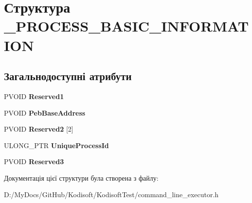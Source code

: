 \hypertarget{struct___p_r_o_c_e_s_s___b_a_s_i_c___i_n_f_o_r_m_a_t_i_o_n}{\section{Структура \+\_\+\+P\+R\+O\+C\+E\+S\+S\+\_\+\+B\+A\+S\+I\+C\+\_\+\+I\+N\+F\+O\+R\+M\+A\+T\+I\+O\+N}
\label{struct___p_r_o_c_e_s_s___b_a_s_i_c___i_n_f_o_r_m_a_t_i_o_n}
}
\subsection*{Загальнодоступні атрибути}
\begin{DoxyCompactItemize}
\item 
\hypertarget{struct___p_r_o_c_e_s_s___b_a_s_i_c___i_n_f_o_r_m_a_t_i_o_n_ac25372bf10c8a8ebac9d189bc0e6ecdc}{P\+V\+O\+I\+D {\bfseries Reserved1}}\label{struct___p_r_o_c_e_s_s___b_a_s_i_c___i_n_f_o_r_m_a_t_i_o_n_ac25372bf10c8a8ebac9d189bc0e6ecdc}

\item 
\hypertarget{struct___p_r_o_c_e_s_s___b_a_s_i_c___i_n_f_o_r_m_a_t_i_o_n_a411f27dee3e5ef61626c15e1b64cc058}{P\+V\+O\+I\+D {\bfseries Peb\+Base\+Address}}\label{struct___p_r_o_c_e_s_s___b_a_s_i_c___i_n_f_o_r_m_a_t_i_o_n_a411f27dee3e5ef61626c15e1b64cc058}

\item 
\hypertarget{struct___p_r_o_c_e_s_s___b_a_s_i_c___i_n_f_o_r_m_a_t_i_o_n_ac89c5f2b3af610c8748dcc3c5790a061}{P\+V\+O\+I\+D {\bfseries Reserved2} \mbox{[}2\mbox{]}}\label{struct___p_r_o_c_e_s_s___b_a_s_i_c___i_n_f_o_r_m_a_t_i_o_n_ac89c5f2b3af610c8748dcc3c5790a061}

\item 
\hypertarget{struct___p_r_o_c_e_s_s___b_a_s_i_c___i_n_f_o_r_m_a_t_i_o_n_afe6e56b5ae0aff9044ee218c86f59f2d}{U\+L\+O\+N\+G\+\_\+\+P\+T\+R {\bfseries Unique\+Process\+Id}}\label{struct___p_r_o_c_e_s_s___b_a_s_i_c___i_n_f_o_r_m_a_t_i_o_n_afe6e56b5ae0aff9044ee218c86f59f2d}

\item 
\hypertarget{struct___p_r_o_c_e_s_s___b_a_s_i_c___i_n_f_o_r_m_a_t_i_o_n_a88b84e8b2c7f6c241ea9e20e8376abaf}{P\+V\+O\+I\+D {\bfseries Reserved3}}\label{struct___p_r_o_c_e_s_s___b_a_s_i_c___i_n_f_o_r_m_a_t_i_o_n_a88b84e8b2c7f6c241ea9e20e8376abaf}

\end{DoxyCompactItemize}


Документація цієї структури була створена з файлу\+:\begin{DoxyCompactItemize}
\item 
D\+:/\+My\+Docs/\+Git\+Hub/\+Kodisoft/\+Kodisoft\+Test/command\+\_\+line\+\_\+executor.\+h\end{DoxyCompactItemize}
